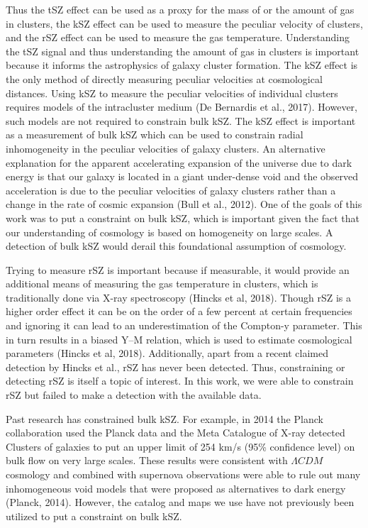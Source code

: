 \documentclass{princeton_astro_thesis}
\begin{document}
\par Thus the tSZ effect can be used as a proxy for the mass of or the amount of gas in clusters, the kSZ effect can be used to measure the peculiar velocity of clusters, and the rSZ effect can be used to measure the gas temperature. Understanding the tSZ signal and thus understanding the amount of gas in clusters is important because it informs the astrophysics of galaxy cluster formation. The kSZ effect is the only method of directly measuring peculiar velocities at cosmological distances. Using kSZ to measure the peculiar velocities of individual clusters requires models of the intracluster medium (De Bernardis et al., 2017). However, such models are not required to constrain bulk kSZ. The kSZ effect is important as a measurement of bulk kSZ which can be used to constrain radial inhomogeneity in the peculiar velocities of galaxy clusters. An alternative explanation for the apparent accelerating expansion of the universe due to dark energy is that our galaxy is located in a giant under-dense void and the observed acceleration is due to the peculiar velocities of galaxy clusters rather than a change in the rate of cosmic expansion (Bull et al., 2012). One of the goals of this work was to put a constraint on bulk kSZ, which is important given the fact that our understanding of cosmology is based on homogeneity on large scales. A detection of bulk kSZ would derail this foundational assumption of cosmology.
\par Trying to measure rSZ is important because if measurable, it would provide an additional means of measuring the gas temperature in clusters, which is traditionally done via X-ray spectroscopy (Hincks et al, 2018). Though rSZ is a higher order effect it can be on the order of a few percent at certain frequencies and ignoring it can lead to an underestimation of the Compton-y parameter. This in turn results in a biased Y--M relation, which is used to estimate cosmological parameters (Hincks et al, 2018). Additionally, apart from a recent claimed detection by Hincks et al., rSZ has never been detected. Thus, constraining or detecting rSZ is itself a topic of interest. In this work, we were able to constrain rSZ but failed to make a detection with the available data. 
\par Past research has constrained bulk kSZ. For example, in 2014 the Planck collaboration used the Planck data and the Meta Catalogue of X-ray detected Clusters of galaxies to put an upper limit of  254 km/s (95\% confidence level) on bulk flow on very large scales. These results were consistent with $\Lambda CDM$ cosmology and combined with supernova observations were able to rule out many inhomogeneous void models that were proposed as alternatives to dark energy (Planck, 2014). However, the catalog and maps we use have not previously been utilized to put a constraint on bulk kSZ. 
\end{document}
